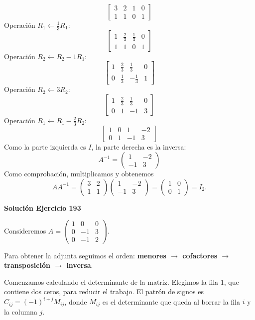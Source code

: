 \documentclass[12pt]{article}
\theoremstyle{remark}
\begin{document}
\[
\left[\begin{array}{rr|rr}3&2&1&0\\1&1&0&1\end{array}\right]
\]
Operación $R_{1}\leftarrow \frac{1}{3}R_{1}$:
\[
\left[\begin{array}{rr|rr}1&\frac{2}{3}&\frac{1}{3}&0\\1&1&0&1\end{array}\right]
\]
Operación $R_{2}\leftarrow R_{2}-1R_{1}$:
\[
\left[\begin{array}{rr|rr}1&\frac{2}{3}&\frac{1}{3}&0\\0&\frac{1}{3}&- \frac{1}{3}&1\end{array}\right]
\]
Operación $R_{2}\leftarrow 3R_{2}$:
\[
\left[\begin{array}{rr|rr}1&\frac{2}{3}&\frac{1}{3}&0\\0&1&-1&3\end{array}\right]
\]
Operación $R_{1}\leftarrow R_{1}-\frac{2}{3}R_{2}$:
\[
\left[\begin{array}{rr|rr}1&0&1&-2\\0&1&-1&3\end{array}\right]
\]
Como la parte izquierda es $I$, la parte derecha es la inversa:
\[
\boxed{A^{-1}=\begin{pmatrix}1&-2\\-1&3\end{pmatrix}}
\]
Como comprobación, multiplicamos y obtenemos
\[
AA^{-1}=\begin{pmatrix}3&2\\1&1\end{pmatrix}\begin{pmatrix}1&-2\\-1&3\end{pmatrix}=\begin{pmatrix}1&0\\0&1\end{pmatrix}=I_{2}.
\]

\par\bigskip\noindent\textbf{Solución Ejercicio 193}\par\nobreak
Consideremos $A=\begin{pmatrix}1&0&0\\0&-1&3\\0&-1&2\end{pmatrix}$.

Para obtener la adjunta seguimos el orden: \textbf{menores $\to$ cofactores $\to$ transposición $\to$ inversa}.

Comenzamos calculando el determinante de la matriz.
Elegimos la fila 1, que contiene dos ceros, para reducir el trabajo. El patrón de signos es $C_{ij}=(-1)^{i+j}M_{ij}$, donde $M_{ij}$ es el determinante que queda al borrar la fila $i$ y la columna $j$.
\end{document}

